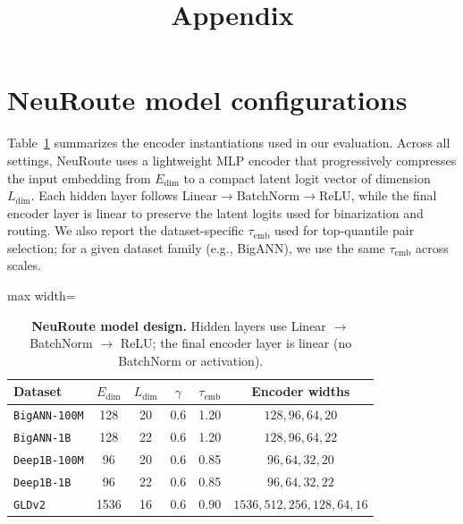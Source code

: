 \documentclass[sigconf, nonacm]{acmart}
\begin{document}
\title{Appendix}
\maketitle

\section{NeuRoute model configurations}
\label{app:encoder_config}

Table~\ref{tab:NeuRoute-arch} summarizes the encoder instantiations used in our evaluation.
Across all settings, NeuRoute uses a lightweight MLP encoder that progressively compresses the input embedding from $E_{\mathrm{dim}}$ to a compact latent logit vector of dimension $L_{\mathrm{dim}}$.
Each hidden layer follows Linear$\rightarrow$BatchNorm$\rightarrow$ReLU, while the final encoder layer is linear to preserve the latent logits used for binarization and routing.
We also report the dataset-specific $\tau_{\mathrm{emb}}$ used for top-quantile pair selection; for a given dataset family (e.g., BigANN), we use the same $\tau_{\mathrm{emb}}$ across scales.

\begin{table}[t]
  \caption{\textbf{NeuRoute model design.} Hidden layers use Linear $\rightarrow$ BatchNorm $\rightarrow$ ReLU; the final encoder layer is linear (no BatchNorm or activation).}
  \label{tab:NeuRoute-arch}
  \centering
  \small
  \setlength{\tabcolsep}{4pt}
  \renewcommand{\arraystretch}{1.05}
  \begin{adjustbox}{max width=\linewidth}
  \begin{tabular}{@{}lccccc@{}}
    \toprule
    \textbf{Dataset} & \textbf{$E_{\mathrm{dim}}$} & \textbf{$L_{\mathrm{dim}}$} & \textbf{$\gamma$} & \textbf{$\tau_{\mathrm{emb}}$} & \textbf{Encoder widths} \\
    \midrule
    \texttt{BigANN-100M}  & 128  & 20 & 0.6 & 1.20 & $128, 96, 64, 20$ \\
    \texttt{BigANN-1B}    & 128  & 22 & 0.6 & 1.20 & $128, 96, 64, 22$ \\
    \texttt{Deep1B-100M}  & 96   & 20 & 0.6 & 0.85 & $96, 64, 32, 20$ \\
    \texttt{Deep1B-1B}    & 96   & 22 & 0.6 & 0.85 & $96, 64, 32, 22$ \\
    \texttt{GLDv2}        & 1536 & 16 & 0.6 & 0.90 & $1536, 512, 256, 128, 64, 16$ \\
    \bottomrule
  \end{tabular}
  \end{adjustbox}
\end{table}
\end{document}

